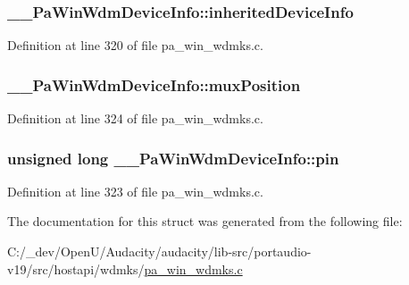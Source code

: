 \subsubsection[{\texorpdfstring{inherited\+Device\+Info}{inheritedDeviceInfo}}]{ \+\_\+\+\_\+\+Pa\+Win\+Wdm\+Device\+Info\+::inherited\+Device\+Info}\hypertarget{struct_____pa_win_wdm_device_info_a529bc0e5844539996188948f28fd6bcd}{}\label{struct_____pa_win_wdm_device_info_a529bc0e5844539996188948f28fd6bcd}


Definition at line 320 of file pa\+\_\+win\+\_\+wdmks.\+c.

\subsubsection[{\texorpdfstring{mux\+Position}{muxPosition}}]{ \+\_\+\+\_\+\+Pa\+Win\+Wdm\+Device\+Info\+::mux\+Position}\hypertarget{struct_____pa_win_wdm_device_info_ac4769a798b0d43861e1ce362afe729b2}{}\label{struct_____pa_win_wdm_device_info_ac4769a798b0d43861e1ce362afe729b2}


Definition at line 324 of file pa\+\_\+win\+\_\+wdmks.\+c.

\subsubsection[{\texorpdfstring{pin}{pin}}]{\setlength{\rightskip}{0pt plus 5cm}unsigned long \+\_\+\+\_\+\+Pa\+Win\+Wdm\+Device\+Info\+::pin}\hypertarget{struct_____pa_win_wdm_device_info_ad47a164d9d771b528bb67bb8da07c839}{}\label{struct_____pa_win_wdm_device_info_ad47a164d9d771b528bb67bb8da07c839}


Definition at line 323 of file pa\+\_\+win\+\_\+wdmks.\+c.



The documentation for this struct was generated from the following file\+:\begin{DoxyCompactItemize}
\item 
C\+:/\+\_\+dev/\+Open\+U/\+Audacity/audacity/lib-\/src/portaudio-\/v19/src/hostapi/wdmks/\hyperlink{pa__win__wdmks_8c}{pa\+\_\+win\+\_\+wdmks.\+c}\end{DoxyCompactItemize}
